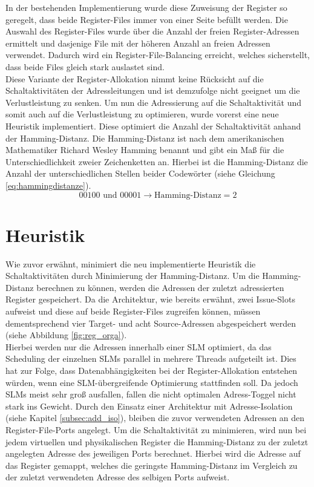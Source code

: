 In der bestehenden Implementierung wurde diese Zuweisung der Register so geregelt, dass beide Register-Files immer von einer Seite befüllt werden. Die Auswahl des Register-Files wurde über die Anzahl der freien Register-Adressen ermittelt und dasjenige File mit der höheren Anzahl an freien Adressen verwendet. Dadurch wird ein Register-File-Balancing erreicht, welches sicherstellt, dass beide Files gleich stark auslastet sind.\\
Diese Variante der Register-Allokation nimmt keine Rücksicht auf die Schaltaktivitäten der Adressleitungen und ist demzufolge nicht geeignet um die Verlustleistung zu senken.
Um nun die Adressierung auf die Schaltaktivität und somit auch auf die Verlustleistung zu optimieren, wurde vorerst eine neue Heuristik implementiert.
Diese optimiert die Anzahl der Schaltaktivität anhand der Hamming-Distanz.
Die Hamming-Distanz ist nach dem amerikanischen Mathematiker Richard Wesley Hamming benannt und gibt ein Maß für die Unterschiedlichkeit zweier Zeichenketten an. Hierbei ist die Hamming-Distanz die Anzahl der unterschiedlichen Stellen beider Codewörter (siehe Gleichung \ref{eq:hammingdistanze})\cite{hamming1950error}.
\begin{equation}
00100 \text{ und } 00001 \rightarrow \text{Hamming-Distanz}= 2
\label{eq:hammingdistanze}
\end{equation}
 
\section{Heuristik}
\label{sec:Heuristik}
Wie zuvor erwähnt, minimiert die neu implementierte Heuristik die Schaltaktivitäten durch Minimierung der Hamming-Distanz. Um die Hamming-Distanz berechnen zu können, werden die Adressen der zuletzt adressierten Register gespeichert. Da die Architektur, wie bereits erwähnt, zwei Issue-Slots aufweist und diese auf beide Register-Files zugreifen können, müssen dementsprechend vier Target- und acht Source-Adressen abgespeichert werden (siehe Abbildung \ref{fig:reg_orga}).\\
Hierbei werden nur die Adressen innerhalb einer SLM optimiert, da das Scheduling der einzelnen SLMs parallel in mehrere Threads aufgeteilt ist. Dies hat zur Folge, dass Datenabhängigkeiten bei der Register-Allokation entstehen würden, wenn eine SLM-übergreifende Optimierung stattfinden soll. Da jedoch SLMs meist sehr groß ausfallen, fallen die nicht optimalen Adress-Toggel nicht stark ins Gewicht. 
Durch den Einsatz einer Architektur mit Adresse-Isolation (siehe Kapitel \ref{subsec:add_iso}), bleiben die zuvor verwendeten Adressen an den Register-File-Ports angelegt. Um die Schaltaktivität zu minimieren, wird nun bei jedem virtuellen und physikalischen Register die Hamming-Distanz zu der zuletzt angelegten Adresse des jeweiligen Ports berechnet. Hierbei wird die Adresse auf das Register gemappt, welches die geringste Hamming-Distanz im Vergleich zu der zuletzt verwendeten Adresse des selbigen Ports aufweist.\\

